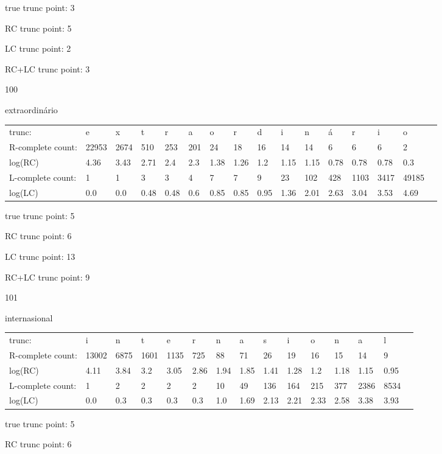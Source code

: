 \documentclass{article}
\begin{document}
true trunc point: 3

RC trunc point: 5

LC trunc point: 2

RC+LC trunc point: 3

\vspace{1em}

100

extraordinário

\begin{tabular}{l|lllllllllllllll}
trunc: & e & x & t & r & a & o & r & d & i & n & á & r & i & o & \\ 
R-complete count: & 22953 & 2674 & 510 & 253 & 201 & 24 & 18 & 16 & 14 & 14 & 6 & 6 & 6 & 2 & \\ 
log(RC) & 4.36 & 3.43 & 2.71 & 2.4 & 2.3 & 1.38 & 1.26 & 1.2 & 1.15 & 1.15 & 0.78 & 0.78 & 0.78 & 0.3 & \\ 
L-complete count: & 1 & 1 & 3 & 3 & 4 & 7 & 7 & 9 & 23 & 102 & 428 & 1103 & 3417 & 49185 & \\ 
log(LC) & 0.0 & 0.0 & 0.48 & 0.48 & 0.6 & 0.85 & 0.85 & 0.95 & 1.36 & 2.01 & 2.63 & 3.04 & 3.53 & 4.69 & \\ 
\end{tabular}

true trunc point: 5

RC trunc point: 6

LC trunc point: 13

RC+LC trunc point: 9

\newpage

101

internasional

\begin{tabular}{l|llllllllllllll}
trunc: & i & n & t & e & r & n & a & s & i & o & n & a & l & \\ 
R-complete count: & 13002 & 6875 & 1601 & 1135 & 725 & 88 & 71 & 26 & 19 & 16 & 15 & 14 & 9 & \\ 
log(RC) & 4.11 & 3.84 & 3.2 & 3.05 & 2.86 & 1.94 & 1.85 & 1.41 & 1.28 & 1.2 & 1.18 & 1.15 & 0.95 & \\ 
L-complete count: & 1 & 2 & 2 & 2 & 2 & 10 & 49 & 136 & 164 & 215 & 377 & 2386 & 8534 & \\ 
log(LC) & 0.0 & 0.3 & 0.3 & 0.3 & 0.3 & 1.0 & 1.69 & 2.13 & 2.21 & 2.33 & 2.58 & 3.38 & 3.93 & \\ 
\end{tabular}

true trunc point: 5

RC trunc point: 6
\end{document}
